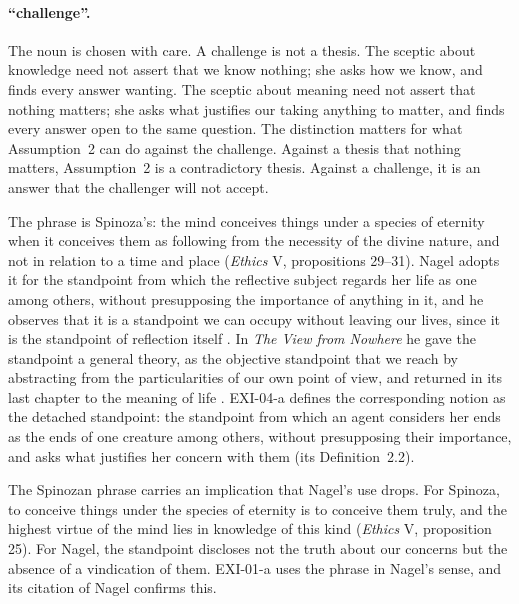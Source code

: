 \paragraph{\enquote{challenge}.} The noun is chosen with care. A challenge is not a thesis. The sceptic about knowledge need not assert that we know nothing; she asks how we know, and finds every answer wanting. The sceptic about meaning need not assert that nothing matters; she asks what justifies our taking anything to matter, and finds every answer open to the same question. The distinction matters for what Assumption~2 can do against the challenge. Against a thesis that nothing matters, Assumption~2 is a contradictory thesis. Against a challenge, it is an answer that the challenger will not accept.


The phrase is Spinoza's: the mind conceives things under a species of eternity when it conceives them as following from the necessity of the divine nature, and not in relation to a time and place (\emph{Ethics} V, propositions 29--31). Nagel adopts it for the standpoint from which the reflective subject regards her life as one among others, without presupposing the importance of anything in it, and he observes that it is a standpoint we can occupy without leaving our lives, since it is the standpoint of reflection itself \citep{Nagel1971}. In \emph{The View from Nowhere} he gave the standpoint a general theory, as the objective standpoint that we reach by abstracting from the particularities of our own point of view, and returned in its last chapter to the meaning of life \citep{Nagel1986}. EXI-04-a defines the corresponding notion as the detached standpoint: the standpoint from which an agent considers her ends as the ends of one creature among others, without presupposing their importance, and asks what justifies her concern with them (its Definition~2.2).

The Spinozan phrase carries an implication that Nagel's use drops. For Spinoza, to conceive things under the species of eternity is to conceive them truly, and the highest virtue of the mind lies in knowledge of this kind (\emph{Ethics} V, proposition 25). For Nagel, the standpoint discloses not the truth about our concerns but the absence of a vindication of them. EXI-01-a uses the phrase in Nagel's sense, and its citation of Nagel confirms this.


